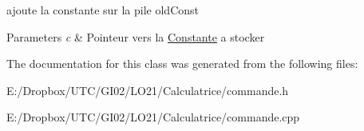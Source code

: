 ajoute la constante sur la pile old\-Const 


\begin{DoxyParams}{Parameters}
{\em c} & Pointeur vers la \hyperlink{class_constante}{Constante} a stocker \\
\hline
\end{DoxyParams}


The documentation for this class was generated from the following files\-:\begin{DoxyCompactItemize}
\item 
E\-:/\-Dropbox/\-U\-T\-C/\-G\-I02/\-L\-O21/\-Calculatrice/commande.\-h\item 
E\-:/\-Dropbox/\-U\-T\-C/\-G\-I02/\-L\-O21/\-Calculatrice/commande.\-cpp\end{DoxyCompactItemize}
